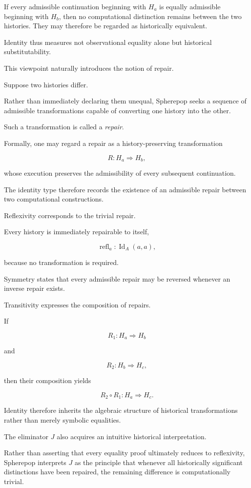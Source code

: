 \documentclass[12pt,oneside]{article}
\theoremstyle{definition}
\theoremstyle{remark}
\begin{document}
If every admissible continuation beginning with \(H_a\) is equally admissible
beginning with \(H_b\), then no computational distinction remains between the
two histories. They may therefore be regarded as historically equivalent.

Identity thus measures not observational equality alone but historical
substitutability.

This viewpoint naturally introduces the notion of repair.

Suppose two histories differ.

Rather than immediately declaring them unequal, Spherepop seeks a sequence of
admissible transformations capable of converting one history into the other.

Such a transformation is called a \emph{repair}.

Formally, one may regard a repair as a history-preserving transformation

\[
R :
H_a
\Longrightarrow
H_b,
\]

whose execution preserves the admissibility of every subsequent continuation.

The identity type therefore records the existence of an admissible repair
between two computational constructions.

Reflexivity corresponds to the trivial repair.

Every history is immediately repairable to itself,

\[
\operatorname{refl}_a :
\operatorname{Id}_A(a,a),
\]

because no transformation is required.

Symmetry states that every admissible repair may be reversed whenever an
inverse repair exists.

Transitivity expresses the composition of repairs.

If

\[
R_1 :
H_a
\Longrightarrow
H_b
\]

and

\[
R_2 :
H_b
\Longrightarrow
H_c,
\]

then their composition yields

\[
R_2\circ R_1 :
H_a
\Longrightarrow
H_c.
\]

Identity therefore inherits the algebraic structure of historical
transformations rather than merely symbolic equalities.

The eliminator \(J\) also acquires an intuitive historical interpretation.

Rather than asserting that every equality proof ultimately reduces to
reflexivity, Spherepop interprets \(J\) as the principle that whenever all
historically significant distinctions have been repaired, the remaining
difference is computationally trivial.
\end{document}
